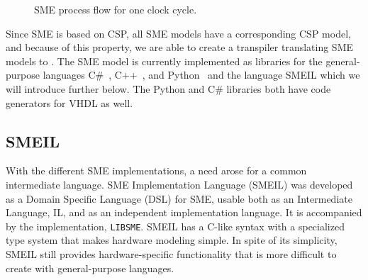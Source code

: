 


\begin{figure}[!ht]
  \centering
  \caption{SME process flow for one clock cycle.}
  \label{fig:sme_process_flow}
\end{figure}
Since SME is based on CSP, all SME models have a
corresponding CSP model, and because of this property, we are able to create a transpiler translating SME models to \cspm{}.
The SME model is currently implemented as libraries for the general-purpose languages C\#~\cite{Skovhede}, C++~\cite{asheim2015}, and Python~\cite{asheim2016vhdl} and the language SMEIL which we will introduce further below. The Python and C\# libraries both have code generators for VHDL as well.
\subsection{SMEIL}
\label{sec:background_smeil}
With the different SME implementations, a need arose for a common intermediate language. SME Implementation Language (SMEIL) was developed as a Domain Specific Language (DSL) for SME, usable both as an Intermediate Language, IL, and as an independent implementation language. It is accompanied by the implementation, \texttt{LIBSME}. %
SMEIL has a C-like syntax with a specialized type system that makes hardware modeling simple. In spite of its simplicity, SMEIL still provides hardware-specific functionality that is more difficult to create with general-purpose languages.

